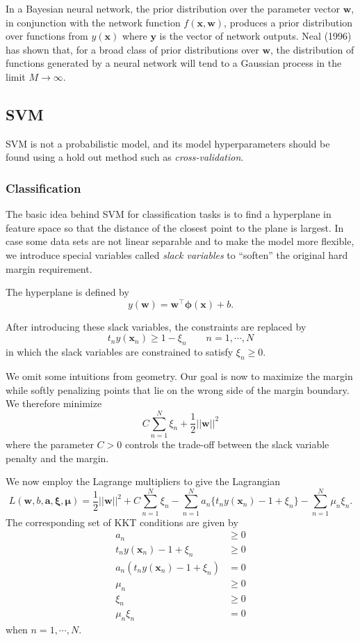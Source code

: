 \documentclass[a4paper]{book}
\renewcommand{\bf}{\mathbf}
\newcommand{\imp}[1]{\textit{#1}}
\newcommand{\bs}{\boldsymbol}
\begin{document}
In a Bayesian neural network, the prior distribution over the parameter vector $\bf{w}$, in conjunction with the network function $f(\bf{x,w})$, produces a prior distribution over functions from $y(\bf{x})$ where $\bf{y}$ is the vector of network outputs. Neal (1996) has shown that, for a broad class of prior distributions over $\bf{w}$, the distribution of functions generated by a neural network will tend to a Gaussian process in the limit $M \rightarrow \infty$.

\subsection{SVM}
SVM is not a probabilistic model, and its model hyperparameters should be found using a hold out method such as \imp{cross-validation}.
\subsubsection{Classification}
The basic idea behind SVM for classification tasks is to find a hyperplane in feature space so that the distance of the closest point to the plane is largest. In case some data sets are not linear separable and to make the model more flexible, we introduce special variables called \imp{slack variables} to ``soften'' the original hard margin requirement. 

The hyperplane is defined by
\begin{equation}
	y(\bf{w}) = \bf{w}^{\intercal} \bs{\phi}(\bf{x}) + b.
\end{equation}

After introducing these slack variables, the constraints are replaced by
\begin{equation}
	t_n y(\bf{x}_n) \geq 1 -\xi_n \qquad n = 1,\cdots,N
\end{equation}
in which the slack variables are constrained to satisfy $\xi_n \geq 0$.

We omit some intuitions from geometry. Our goal is now to maximize the margin while softly penalizing points that lie on the wrong side of the margin boundary. We therefore minimize
\begin{equation}
	C\sum_{n=1}^N \xi_n + \frac{1}{2} ||\bf{w}||^2
\end{equation}
where the parameter $C > 0$ controls the trade-off between the slack variable penalty and the margin.

We now employ the Lagrange multipliers to give the Lagrangian
\begin{equation}
	L(\bf{w},b,\bf{a},\bs{\xi},\bs{\mu}) = \frac{1}{2} ||\bf{w}||^2 + C \sum_{n=1}^N \xi_n - \sum_{n=1}^N a_n \{ t_n y(\bf{x}_n) -1 + \xi_n \} - \sum_{n=1}^N \mu_n \xi_n.
\end{equation}
The corresponding set of KKT conditions are given by
\begin{align}
	a_n &\geq 0 \\
	t_n y(\bf{x}_n) -1 + \xi_n &\geq 0 \\
	a_n(t_n y(\bf{x}_n)-1+\xi_n) &= 0 \\
	\mu_n &\geq 0 \\
	\xi_n & \geq 0 \\
	\mu_n \xi_n &= 0
\end{align}
when $n = 1,\cdots,N$.
\end{document}
